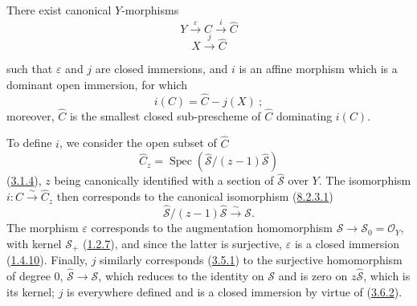 \begin{proposition}[8.3.2]
\label{II.8.3.2}
There exist canonical $Y$-morphisms
\begin{equation}
\label{II.8.3.2.1}
  Y\xrightarrow{\varepsilon}C\xrightarrow{i}\widehat{C}
\tag{8.3.2.1}
\end{equation}
\begin{equation}
\label{II.8.3.2.2}
  X\xrightarrow{j}\widehat{C}
\tag{8.3.2.2}
\end{equation}

such that $\varepsilon$ and $j$ are closed immersions, and $i$ is an affine
morphism which is a dominant open immersion, for which
\begin{equation}
\label{II.8.3.2.3}
  i(C)=\widehat{C}-j(X)~;
\tag{8.3.2.3}
\end{equation}
moreover, $\widehat{C}$ is the smallest closed sub-prescheme of $\widehat{C}$
dominating $i(C)$.
\end{proposition}

To define $i$, we consider the open subset of $\widehat{C}$
\begin{equation}
\label{II.8.3.2.4}
  \widehat{C}_z=
  \operatorname{Spec}(\widehat{\mathcal{S}}/(z-1)\widehat{\mathcal{S}})
\tag{8.3.2.4}
\end{equation}
(\hyperref[II.3.1.4]{3.1.4}), $z$ being canonically identified with a
section of $\widehat{\mathcal{S}}$ over $Y$. The isomorphism
$i:C\xrightarrow{\sim}\widehat{C}_z$ then corresponds to the canonical
isomorphism (\hyperref[II.8.2.3.1]{8.2.3.1})
\[
  \widehat{\mathcal{S}}/(z-1)\widehat{\mathcal{S}}
  \xrightarrow{\sim}\mathcal{S}.
\]
The morphism $\varepsilon$ corresponds to the augmentation homomorphism
$\mathcal{S}\to\mathcal{S}_0=\mathcal{O}_Y$, with kernel
$\mathcal{S}_+$ (\hyperref[II.1.2.7]{1.2.7}), and since the latter is
surjective, $\varepsilon$ is a closed immersion
(\hyperref[II.1.4.10]{1.4.10}). Finally, $j$ similarly corresponds
(\hyperref[II.3.5.1]{3.5.1}) to the surjective homomorphism of degree $0$,
$\widehat{\mathcal{S}}\to\mathcal{S}$, which reduces to the identity on
$\mathcal{S}$ and is zero on $z\widehat{\mathcal{S}}$, which is its kernel;
$j$ is everywhere defined and is a closed immersion by virtue of
(\hyperref[II.3.6.2]{3.6.2}).

